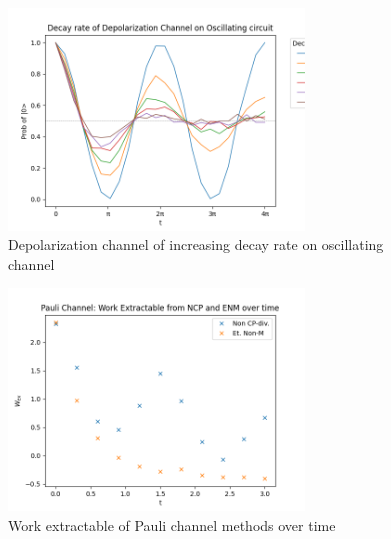 \documentclass[12pt]{article}
\begin{document}
\begin{figure}
  \centering
  \includegraphics[width=0.7\textwidth]{images/depolarization_decay_oscillating.png}
  \caption{Depolarization channel of increasing decay rate on oscillating channel}
  \label{fig:depolarization_deay_oscillating}
\end{figure}

\begin{figure}
  \centering
  \includegraphics[width=0.7\textwidth]{images/Pauli_work_extractable.png}
  \caption{Work extractable of Pauli channel methods over time}
  \label{fig:Pauli_work_extractable}
\end{figure}



  \printbibliography
\end{document}
